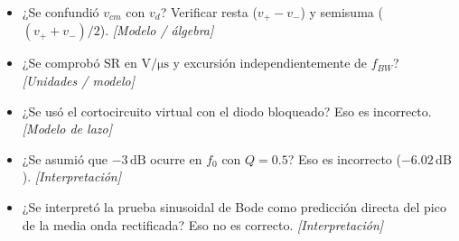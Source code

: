 \documentclass[10pt, a4paper]{article}
\begin{document}
\begin{tcolorbox}[colback=neutralbg, colframe=ucbblue, title=\textbf{V8: Autoevaluación y Errores Frecuentes de la Práctica (sin nota sumativa)}]
    \footnotesize
    \begin{itemize}\setlength\itemsep{2pt}
        \item[$\square$] ¿Se confundió $v_{cm}$ con $v_d$? Verificar resta ($v_+ - v_-$) y semisuma ($(v_+ + v_-)/2$). \textit{[Modelo / álgebra]}
        \item[$\square$] ¿Se comprobó $\mathrm{SR}$ en $\mathrm{V/\mu s}$ y excursión independientemente de $f_{BW}$? \textit{[Unidades / modelo]}
        \item[$\square$] ¿Se usó el cortocircuito virtual con el diodo bloqueado? Eso es incorrecto. \textit{[Modelo de lazo]}
        \item[$\square$] ¿Se asumió que $-3\,\mathrm{dB}$ ocurre en $f_0$ con $Q = 0.5$? Eso es incorrecto ($-6.02\,\mathrm{dB}$). \textit{[Interpretación]}
        \item[$\square$] ¿Se interpretó la prueba sinusoidal de Bode como predicción directa del pico de la media onda rectificada? Eso no es correcto. \textit{[Interpretación]}
    \end{itemize}
\end{tcolorbox}
\end{document}
